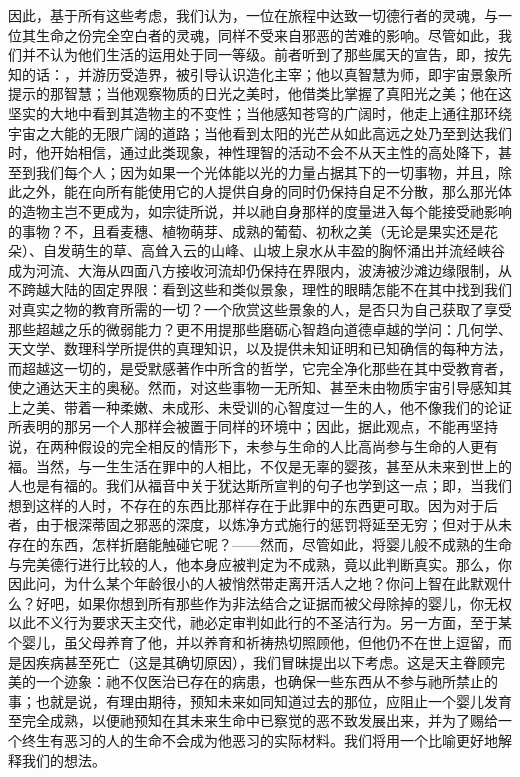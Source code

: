 因此，基于所有这些考虑，我们认为，一位在旅程中达致一切德行者的灵魂，与一位其生命之份完全空白者的灵魂，同样不受来自邪恶的苦难的影响。尽管如此，我们并不认为他们生活的运用处于同一等级。前者听到了那些属天的宣告，即，按先知的话：，并游历受造界，被引导认识造化主宰；他以真智慧为师，即宇宙景象所提示的那智慧；当他观察物质的日光之美时，他借类比掌握了真阳光之美；他在这坚实的大地中看到其造物主的不变性；当他感知苍穹的广阔时，他走上通往那环绕宇宙之大能的无限广阔的道路；当他看到太阳的光芒从如此高远之处乃至到达我们时，他开始相信，通过此类现象，神性理智的活动不会不从天主性的高处降下，甚至到我们每个人；因为如果一个光体能以光的力量占据其下的一切事物，并且，除此之外，能在向所有能使用它的人提供自身的同时仍保持自足不分散，那么那光体的造物主岂不更成为，如宗徒所说，并以祂自身那样的度量进入每个能接受祂影响的事物？不，且看麦穗、植物萌芽、成熟的葡萄、初秋之美（无论是果实还是花朵）、自发萌生的草、高耸入云的山峰、山坡上泉水从丰盈的胸怀涌出并流经峡谷成为河流、大海从四面八方接收河流却仍保持在界限内，波涛被沙滩边缘限制，从不跨越大陆的固定界限：看到这些和类似景象，理性的眼睛怎能不在其中找到我们对真实之物的教育所需的一切？一个欣赏这些景象的人，是否只为自己获取了享受那些超越之乐的微弱能力？更不用提那些磨砺心智趋向道德卓越的学问：几何学、天文学、数理科学所提供的真理知识，以及提供未知证明和已知确信的每种方法，而超越这一切的，是受默感著作中所含的哲学，它完全净化那些在其中受教育者，使之通达天主的奥秘。然而，对这些事物一无所知、甚至未由物质宇宙引导感知其上之美、带着一种柔嫩、未成形、未受训的心智度过一生的人，他不像我们的论证所表明的那另一个人那样会被置于同样的环境中；因此，据此观点，不能再坚持说，在两种假设的完全相反的情形下，未参与生命的人比高尚参与生命的人更有福。当然，与一生生活在罪中的人相比，不仅是无辜的婴孩，甚至从未来到世上的人也是有福的。我们从福音中关于犹达斯所宣判的句子也学到这一点；即，当我们想到这样的人时，不存在的东西比那样存在于此罪中的东西更可取。因为对于后者，由于根深蒂固之邪恶的深度，以炼净方式施行的惩罚将延至无穷；但对于从未存在的东西，怎样折磨能触碰它呢？——然而，尽管如此，将婴儿般不成熟的生命与完美德行进行比较的人，他本身应被判定为不成熟，竟以此判断真实。那么，你因此问，为什么某个年龄很小的人被悄然带走离开活人之地？你问上智在此默观什么？好吧，如果你想到所有那些作为非法结合之证据而被父母除掉的婴儿，你无权以此不义行为要求天主交代，祂必定审判如此行的不圣洁行为。另一方面，至于某个婴儿，虽父母养育了他，并以养育和祈祷热切照顾他，但他仍不在世上逗留，而是因疾病甚至死亡（这是其确切原因），我们冒昧提出以下考虑。这是天主眷顾完美的一个迹象：祂不仅医治已存在的病患，也确保一些东西从不参与祂所禁止的事；也就是说，有理由期待，预知未来如同知道过去的那位，应阻止一个婴儿发育至完全成熟，以便祂预知在其未来生命中已察觉的恶不致发展出来，并为了赐给一个终生有恶习的人的生命不会成为他恶习的实际材料。我们将用一个比喻更好地解释我们的想法。\par

